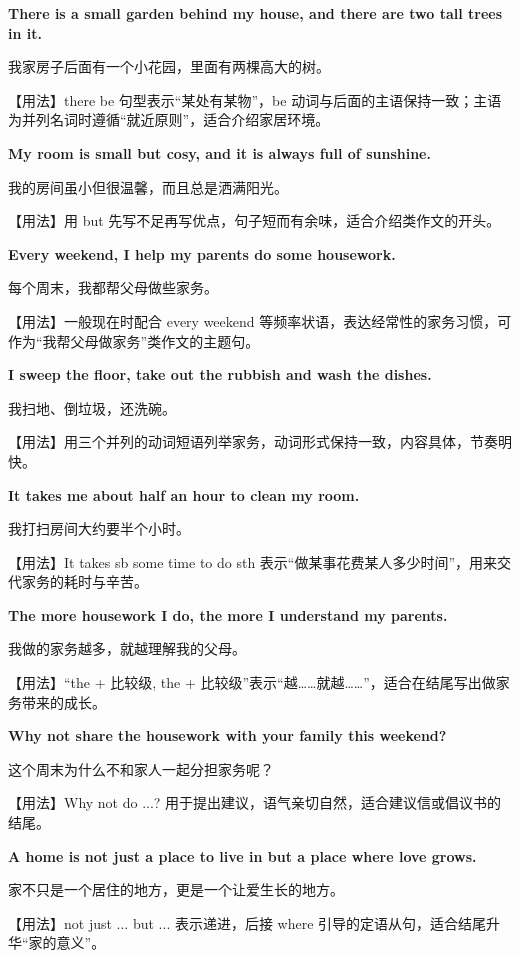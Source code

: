 \documentclass[UTF8,a4paper,11pt,oneside]{ctexbook}
\newcommand{\fansection}[1]{%
  \par\addvspace{2.4ex}%
  \Needspace{6\baselineskip}%
  \noindent{\sffamily\Large\bfseries\color{mainblue}#1}\par
  \nopagebreak
  \addvspace{0.2ex}%
  \noindent{\color{rulelight}\rule{\linewidth}{0.9pt}}\par
  \addvspace{0.9ex}%
  \nobreak
}
\newcommand{\fanpat}[3]{%
  \item{\bfseries #1}\par\nopagebreak
  {\small\color{textgray}#2}\par\nopagebreak
  {\footnotesize\color{accent!90!black}【用法】#3}\par
}
\begin{document}
\fansection{〇、本单元写作常用句型}
\begin{fanpatterns}
\fanpat{There is a small garden behind my house, and there are two tall trees in it.}{我家房子后面有一个小花园，里面有两棵高大的树。}{there be 句型表示“某处有某物”，be 动词与后面的主语保持一致；主语为并列名词时遵循“就近原则”，适合介绍家居环境。}

\fanpat{My room is small but cosy, and it is always full of sunshine.}{我的房间虽小但很温馨，而且总是洒满阳光。}{用 but 先写不足再写优点，句子短而有余味，适合介绍类作文的开头。}

\fanpat{Every weekend, I help my parents do some housework.}{每个周末，我都帮父母做些家务。}{一般现在时配合 every weekend 等频率状语，表达经常性的家务习惯，可作为“我帮父母做家务”类作文的主题句。}

\fanpat{I sweep the floor, take out the rubbish and wash the dishes.}{我扫地、倒垃圾，还洗碗。}{用三个并列的动词短语列举家务，动词形式保持一致，内容具体，节奏明快。}

\fanpat{It takes me about half an hour to clean my room.}{我打扫房间大约要半个小时。}{It takes sb some time to do sth 表示“做某事花费某人多少时间”，用来交代家务的耗时与辛苦。}

\fanpat{The more housework I do, the more I understand my parents.}{我做的家务越多，就越理解我的父母。}{“the + 比较级, the + 比较级”表示“越……就越……”，适合在结尾写出做家务带来的成长。}

\fanpat{Why not share the housework with your family this weekend?}{这个周末为什么不和家人一起分担家务呢？}{Why not do ...? 用于提出建议，语气亲切自然，适合建议信或倡议书的结尾。}

\fanpat{A home is not just a place to live in but a place where love grows.}{家不只是一个居住的地方，更是一个让爱生长的地方。}{not just ... but ... 表示递进，后接 where 引导的定语从句，适合结尾升华“家的意义”。}

\end{fanpatterns}

\fansection{一、满分范文}
\end{document}
